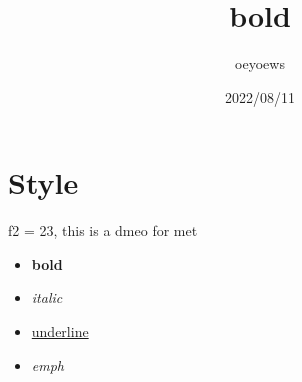 \documentclass[UTF8]{ctexart}
\title{bold}
\author{oeyoews}
\date{2022/08/11}
\begin{document}
\maketitle


\section{Style}%
\label{sec:Style}

f2 = 23, this is a dmeo for met

\begin{itemize}
  \item  \textbf{bold}
  \item \textit{italic}
  \item \underline{underline}
  \item{\emph{emph}}
\end{itemize}
\end{document}
